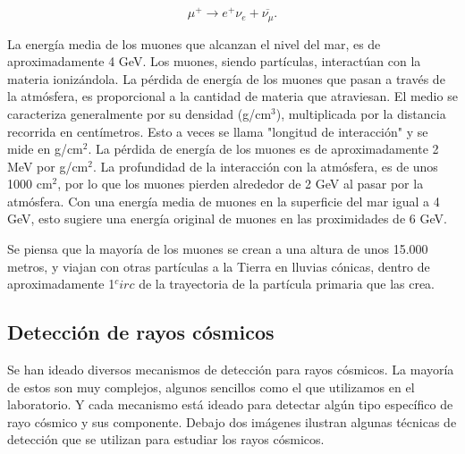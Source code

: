 \documentclass[a4paper,10pt]{article}
\numberwithin{equation}{section}
\begin{document}
\begin{equation}
 \mu^+ \rightarrow e^+ \nu_e + \overline{\nu_\mu}.
\end{equation}

La energía media de los muones que alcanzan el nivel del mar, es de aproximadamente
4 GeV. Los muones, siendo partículas, interactúan con la materia ionizándola. La 
pérdida de energía de los muones que pasan a través de la atmósfera, es proporcional
a la cantidad de materia que atraviesan. El medio se caracteriza generalmente por 
su densidad (g/cm$^3$), multiplicada por la distancia recorrida en centímetros. Esto
a veces se llama "longitud de interacción" y se mide en g/cm$^2$. La pérdida de 
energía de los muones es de aproximadamente 2 MeV por g/cm$^2$. La profundidad de la 
interacción con la atmósfera, es de unos 1000 cm$^2$, por lo que los muones pierden 
alrededor de 2 GeV al pasar por la atmósfera. Con una energía media de muones en la 
superficie del mar igual a 4 GeV, esto sugiere una energía original de muones en las
proximidades de 6 GeV.

\vspace{.3cm}

Se piensa que la mayoría de los muones se crean a una altura de unos 15.000 metros,
y viajan con otras partículas a la Tierra en lluvias cónicas, dentro de aproximadamente
1$^circ$ de la trayectoria de la partícula primaria que las crea. 

\subsection{Detección de rayos cósmicos}

Se han ideado diversos mecanismos de detección para rayos cósmicos. La mayoría de 
estos son muy complejos, algunos sencillos como el que utilizamos en el laboratorio. 
Y cada mecanismo está ideado para detectar algún tipo específico de rayo cósmico 
y sus componente. Debajo dos imágenes ilustran algunas técnicas de detección que 
se utilizan para estudiar los rayos cósmicos.
\end{document}

